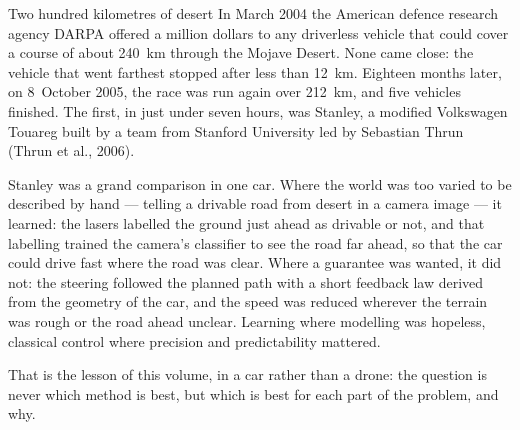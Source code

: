 \begin{curiosity}{Two hundred kilometres of desert}
In March 2004 the American defence research agency DARPA offered a million dollars to any driverless vehicle that could cover a course of about \SI{240}{km} through the Mojave Desert. None came close: the vehicle that went farthest stopped after less than \SI{12}{km}. Eighteen months later, on 8~October 2005, the race was run again over \SI{212}{km}, and five vehicles finished. The first, in just under seven hours, was Stanley, a modified Volkswagen Touareg built by a team from Stanford University led by Sebastian Thrun (Thrun et al., 2006).

Stanley was a grand comparison in one car. Where the world was too varied to be described by hand — telling a drivable road from desert in a camera image — it learned: the lasers labelled the ground just ahead as drivable or not, and that labelling trained the camera's classifier to see the road far ahead, so that the car could drive fast where the road was clear. Where a guarantee was wanted, it did not: the steering followed the planned path with a short feedback law derived from the geometry of the car, and the speed was reduced wherever the terrain was rough or the road ahead unclear. Learning where modelling was hopeless, classical control where precision and predictability mattered.

That is the lesson of this volume, in a car rather than a drone: the question is never which method is best, but which is best for each part of the problem, and why.
\end{curiosity}

